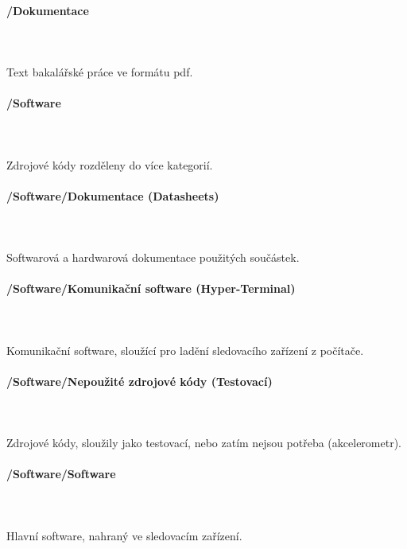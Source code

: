 \documentclass[FM,BP]{tulthesis}  %
\begin{document}
\paragraph{/Dokumentace}\mbox{}\\\mbox{}\\
Text bakalářské práce ve formátu pdf.

\paragraph{/Software}\mbox{}\\\mbox{}\\
Zdrojové kódy rozděleny do více kategorií.

\paragraph{/Software/Dokumentace (Datasheets)}\mbox{}\\\mbox{}\\
Softwarová a hardwarová dokumentace použitých součástek.

\paragraph{/Software/Komunikační software (Hyper-Terminal)}\mbox{}\\\mbox{}\\
Komunikační software, sloužící pro ladění sledovacího zařízení z počítače.

\paragraph{/Software/Nepoužité zdrojové kódy (Testovací)}\mbox{}\\\mbox{}\\
Zdrojové kódy, sloužily jako testovací, nebo zatím nejsou potřeba (akcelerometr).

\paragraph{/Software/Software}\mbox{}\\\mbox{}\\
Hlavní software, nahraný ve sledovacím zařízení.
\end{document}
